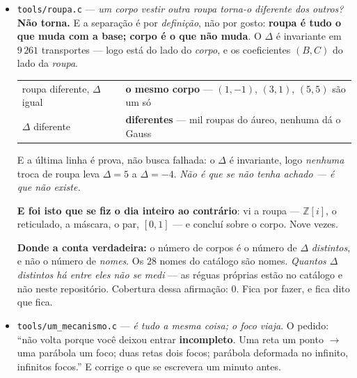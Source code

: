 \documentclass[11pt]{article}
\newcommand{\code}[1]{\texttt{\small #1}}
\newcommand{\Z}{\mathbb Z}
\newcommand{\Q}{\mathbb Q}
\theoremstyle{plain}
\theoremstyle{remark}
\begin{document}
\begin{itemize}
\textbf{A prova de que são diferentes} é o $\Delta$, e é a única que tenho: ele não muda com a base
(\code{topologia.c} §P1), logo dois corpos de $\Delta$ distinto \emph{não se ligam por mudança de
base nenhuma} --- $\Q(\sqrt5)$ e $\Q(i)$ estão a distância $9$, e não há transporte. \textbf{A prova
de que são o mesmo} é a deformação: elipse, cone e simplex com o mesmo $\lambda$ são o mesmo objeto,
e a bijeção é a \emph{identidade} no parâmetro. \textbf{E o contrato não os separa} --- e é assim
que tem de ser: ele verifica que \emph{é} corpo, não \emph{qual} corpo; se separasse, seria
classificador, e o dia inteiro foi a aprender que ele não deve classificar.

\emph{A tensão era anterior, e vinha de se não nomear o nível}: quando dizia ``são $28$'' falava do
$\Delta$; quando dizia ``é a mesma tríade'' falava do contrato --- as duas certas, e a usá-las
como se fossem a mesma afirmação. \textbf{Contar $28$ é contar classes de $\Delta$, não objetos
distintos:} o objeto é um, e o $\Delta$ diz em que ponto dele se está. \emph{``Corpo é corpo'' é a
frase do nível do contrato --- e aí é obviamente verdade.}
\item \code{tools/roupa.c} --- \emph{um corpo vestir outra roupa torna-o diferente dos
outros?} \textbf{Não torna.} E a separação é por \emph{definição}, não por gosto: \textbf{roupa é
tudo o que muda com a base; corpo é o que não muda}. O $\Delta$ é invariante em $9\,261$
transportes --- logo está do lado do \emph{corpo}, e os coeficientes $(B,C)$ do lado da
\emph{roupa}.

\begin{center}\begin{tabular}{ll}
roupa diferente, $\Delta$ igual & \textbf{o mesmo corpo} --- $(1,-1)$, $(3,1)$, $(5,5)$ são um só \\
$\Delta$ diferente & \textbf{diferentes} --- mil roupas do áureo, nenhuma dá o Gauss \\
\end{tabular}\end{center}

E a última linha é prova, não busca falhada: o $\Delta$ é invariante, logo \emph{nenhuma} troca de
roupa leva $\Delta=5$ a $\Delta=-4$. \emph{Não é que se não tenha achado --- é que não existe.}

\textbf{E foi isto que se fiz o dia inteiro ao contrário}: vi a roupa --- $\Z[i]$, o reticulado, a
máscara, o par, $[0,1]$ --- e concluí sobre o corpo. Nove vezes.

\textbf{Donde a conta verdadeira:} o número de corpos é o número de $\Delta$ \emph{distintos}, e
não o número de \emph{nomes}. Os $28$ nomes do catálogo são nomes. \emph{Quantos $\Delta$ distintos
há entre eles não se medi} --- as réguas próprias estão no catálogo e não neste repositório.
Cobertura dessa afirmação: $0$. Fica por fazer, e fica dito que fica.
\item \code{tools/um\_mecanismo.c} --- \emph{é tudo a mesma coisa; o foco viaja}. O pedido:
``não volta porque você deixou entrar \textbf{incompleto}. Uma reta um ponto $\to$ uma parábola um
foco; duas retas dois focos; parábola deformada no infinito, infinitos focos.'' E corrige o que se
escrevera um minuto antes.


\end{itemize}
\end{document}
